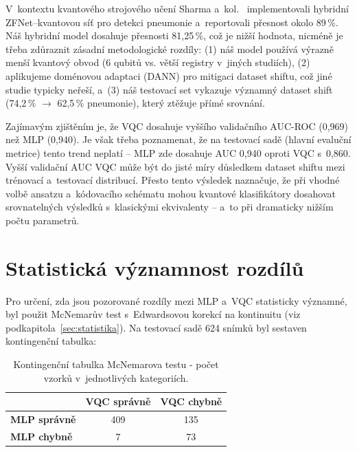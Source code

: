 \documentclass[12pt, a4paper]{report}
\begin{document}
V~kontextu kvantového strojového učení Sharma a~kol.~\cite{pneumonia_detection_qml} implementovali hybridní ZFNet--kvantovou síť pro detekci pneumonie a~reportovali přesnost okolo 89\,\%. Náš hybridní model dosahuje přesnosti 81{,}25\,\%, což je nižší hodnota, nicméně je třeba zdůraznit zásadní metodologické rozdíly: (1) náš model používá výrazně menší kvantový obvod (6 qubitů vs. větší registry v~jiných studiích), (2) aplikujeme doménovou adaptaci (DANN) pro mitigaci dataset shiftu, což jiné studie typicky neřeší, a~(3) náš testovací set vykazuje významný dataset shift (74{,}2\,\% $\to$ 62{,}5\,\% pneumonie), který ztěžuje přímé srovnání.

Zajímavým zjištěním je, že VQC dosahuje vyššího validačního AUC-ROC (0{,}969) než MLP (0{,}940). Je však třeba poznamenat, že na testovací sadě (hlavní evaluční metrice) tento trend neplatí -- MLP zde dosahuje AUC 0{,}940 oproti VQC s~0{,}860. Vyšší validační AUC VQC může být do jisté míry důsledkem dataset shiftu mezi trénovací a~testovací distribucí. Přesto tento výsledek naznačuje, že při vhodné volbě ansatzu a~kódovacího schématu mohou kvantové klasifikátory dosahovat srovnatelných výsledků s~klasickými ekvivalenty -- a~to při dramaticky nižším počtu parametrů.

\section{Statistická významnost rozdílů}
\label{sec:statisticka_vyznamnost}

Pro určení, zda jsou pozorované rozdíly mezi MLP a~VQC statisticky významné, byl použit McNemarův test s~Edwardsovou korekcí na kontinuitu (viz podkapitola~\ref{sec:statistika}). Na testovací sadě 624 snímků byl sestaven kontingenční tabulka:

\begin{table}[htbp]
    \centering
    \caption{Kontingenční tabulka McNemarova testu - počet vzorků v~jednotlivých kategoriích.}
    \label{tab:mcnemar_contingency}
    \begin{tabular}{|l|c|c|}
        \hline
        & \textbf{VQC správně} & \textbf{VQC chybně} \\
        \hline
        \textbf{MLP správně} & 409 & 135 \\
        \hline
        \textbf{MLP chybně} & 7 & 73 \\
        \hline
    \end{tabular}
\end{table}
\end{document}
